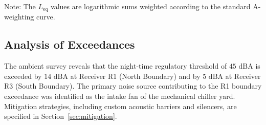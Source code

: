 Note: The $L_{\text{eq}}$ values are logarithmic sums weighted according to the standard A-weighting curve. 

\subsection{Analysis of Exceedances}
The ambient survey reveals that the night-time regulatory threshold of $45\text{~dBA}$ is exceeded by $14\text{~dBA}$ at Receiver R1 (North Boundary) and by $5\text{~dBA}$ at Receiver R3 (South Boundary). The primary noise source contributing to the R1 boundary exceedance was identified as the intake fan of the mechanical chiller yard. Mitigation strategies, including custom acoustic barriers and silencers, are specified in Section~\ref{sec:mitigation}.
